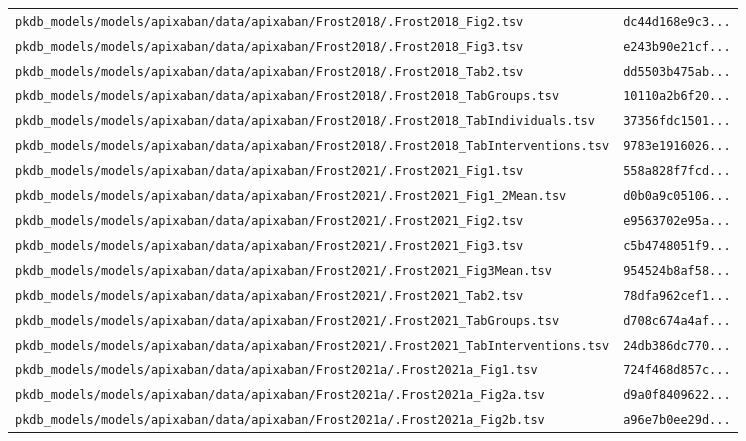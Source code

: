 \documentclass{article}
\begin{document}
\begin{longtable}{ll}
\texttt{pkdb\_models/models/apixaban/data/apixaban/Frost2018/.Frost2018\_Fig2.tsv} & \texttt{dc44d168e9c3...} \\
\texttt{pkdb\_models/models/apixaban/data/apixaban/Frost2018/.Frost2018\_Fig3.tsv} & \texttt{e243b90e21cf...} \\
\texttt{pkdb\_models/models/apixaban/data/apixaban/Frost2018/.Frost2018\_Tab2.tsv} & \texttt{dd5503b475ab...} \\
\texttt{pkdb\_models/models/apixaban/data/apixaban/Frost2018/.Frost2018\_TabGroups.tsv} & \texttt{10110a2b6f20...} \\
\texttt{pkdb\_models/models/apixaban/data/apixaban/Frost2018/.Frost2018\_TabIndividuals.tsv} & \texttt{37356fdc1501...} \\
\texttt{pkdb\_models/models/apixaban/data/apixaban/Frost2018/.Frost2018\_TabInterventions.tsv} & \texttt{9783e1916026...} \\
\texttt{pkdb\_models/models/apixaban/data/apixaban/Frost2021/.Frost2021\_Fig1.tsv} & \texttt{558a828f7fcd...} \\
\texttt{pkdb\_models/models/apixaban/data/apixaban/Frost2021/.Frost2021\_Fig1\_2Mean.tsv} & \texttt{d0b0a9c05106...} \\
\texttt{pkdb\_models/models/apixaban/data/apixaban/Frost2021/.Frost2021\_Fig2.tsv} & \texttt{e9563702e95a...} \\
\texttt{pkdb\_models/models/apixaban/data/apixaban/Frost2021/.Frost2021\_Fig3.tsv} & \texttt{c5b4748051f9...} \\
\texttt{pkdb\_models/models/apixaban/data/apixaban/Frost2021/.Frost2021\_Fig3Mean.tsv} & \texttt{954524b8af58...} \\
\texttt{pkdb\_models/models/apixaban/data/apixaban/Frost2021/.Frost2021\_Tab2.tsv} & \texttt{78dfa962cef1...} \\
\texttt{pkdb\_models/models/apixaban/data/apixaban/Frost2021/.Frost2021\_TabGroups.tsv} & \texttt{d708c674a4af...} \\
\texttt{pkdb\_models/models/apixaban/data/apixaban/Frost2021/.Frost2021\_TabInterventions.tsv} & \texttt{24db386dc770...} \\
\texttt{pkdb\_models/models/apixaban/data/apixaban/Frost2021a/.Frost2021a\_Fig1.tsv} & \texttt{724f468d857c...} \\
\texttt{pkdb\_models/models/apixaban/data/apixaban/Frost2021a/.Frost2021a\_Fig2a.tsv} & \texttt{d9a0f8409622...} \\
\texttt{pkdb\_models/models/apixaban/data/apixaban/Frost2021a/.Frost2021a\_Fig2b.tsv} & \texttt{a96e7b0ee29d...} \\

\end{longtable}
\end{document}
